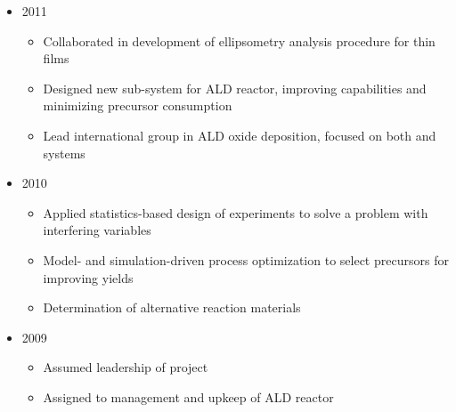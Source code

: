 \documentclass[11pt, letterpaper,sans]{moderncv}
\begin{document}
{\begin{itemize}
\begin{itemize}%
\item 2011
  \begin{itemize}%
     \item Collaborated in development of ellipsometry analysis procedure for thin films
     \item Designed new sub-system for ALD reactor, improving capabilities and minimizing precursor consumption
     \item Lead international group in ALD oxide deposition, focused on both  and  systems
  \end{itemize}
\item 2010
  \begin{itemize}%
     \item Applied statistics-based design of experiments to solve a problem with interfering variables
     \item Model- and simulation-driven process optimization to select precursors for improving yields
     \item Determination of alternative reaction materials
  \end{itemize}
\item 2009
  \begin{itemize}%
     \item Assumed leadership of  project
     \item Assigned to management and upkeep of ALD reactor
  \end{itemize}
\end{itemize}
\end{itemize}
}
\end{document}
